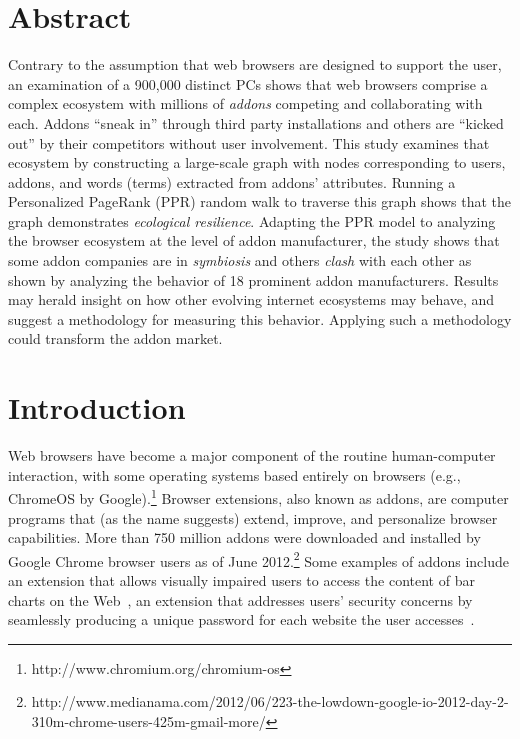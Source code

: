 \documentclass[10pt,letterpaper]{article}
\begin{document}
\section*{Abstract}
Contrary to the assumption that web browsers are designed to support the user, an examination of a 900,000 distinct PCs shows that web browsers comprise a complex ecosystem with millions of \textit{addons} competing and collaborating with each. Addons ``sneak in'' through third party installations and others are ``kicked out'' by their competitors without user involvement. This study examines that ecosystem by constructing a large-scale graph with nodes corresponding to users, addons, and words (terms) extracted from addons' attributes. Running a Personalized PageRank (PPR) random walk to traverse this graph shows that the graph demonstrates \textit{ecological resilience}. Adapting the PPR model to analyzing the browser ecosystem at the level of addon manufacturer, the study shows that some addon companies are in \textit{symbiosis} and others \textit{clash} with each other as shown by analyzing the behavior of 18 prominent addon manufacturers. Results may herald insight on how other evolving internet ecosystems may behave, and suggest a methodology for measuring this behavior. Applying such a methodology could transform the addon market.



\linenumbers

\section*{Introduction}

Web browsers have become a major component of the routine human-computer interaction, with some operating systems based entirely on browsers (e.g., ChromeOS by Google).\footnote{ http://www.chromium.org/chromium-os}  Browser extensions, also known as addons, are computer programs that (as the name suggests) extend, improve, and personalize browser capabilities. More than 750 million addons were downloaded and installed by Google Chrome browser users as of June 2012.\footnote{ http://www.medianama.com/2012/06/223-the-lowdown-google-io-2012-day-2-310m-chrome-users-425m-gmail-more/}  Some examples of addons include an extension that allows visually impaired users to access the content of bar charts on the Web~\cite{elzer2007browser}, an extension that addresses users’ security concerns by seamlessly producing a unique password for each website the user accesses~\cite{ross2005stronger}. 
\end{document}
